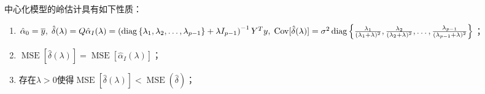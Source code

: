\begin{property}\label{prop:RidgeEstimate}
	中心化模型的岭估计具有如下性质：
	\begin{enumerate}
		\item $\hat{\alpha}_0=\overline{y},\;\hat{\delta}(\lambda)=Q\hat{\alpha}_I(\lambda)=\left(\operatorname{diag}\left\{\lambda_1, \lambda_2, \dots, \lambda_{p-1}\right\}+\lambda I_{p-1}\right)^{-1}Y^Ty,\;\operatorname{Cov}[\hat{\delta}(\lambda)]=\sigma^2\operatorname{diag}\left\{\frac{\lambda_1}{(\lambda_1+\lambda)^2},\frac{\lambda_2}{(\lambda_2+\lambda)^2},\dots,\frac{\lambda_{p-1}}{(\lambda_{p-1}+\lambda)^2}\right\}$；
		\item $\operatorname{MSE}[\hat{\delta}(\lambda)]=\operatorname{MSE}[\hat{\alpha}_I(\lambda)]$；
		\item 存在$\lambda>0$使得$\operatorname{MSE}[\hat{\delta}(\lambda)]<\operatorname{MSE}(\hat{\delta})$；
	\end{enumerate}
\end{property}
